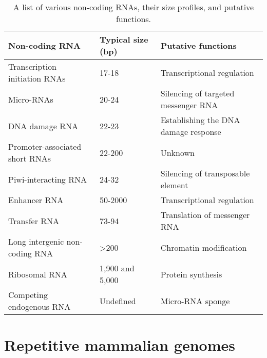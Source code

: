\begin{table}[h]
   \footnotesize
   \begin{tabular}{p{3cm} l p{5cm}}
\textbf{Non-coding RNA}                       & \textbf{Typical size (bp)} & \textbf{Putative functions}              \\ \hline
Transcription initiation RNAs                 & 17-18                      & Transcriptional regulation               \\ \hline
Micro-RNAs                                    & 20-24                      & Silencing of targeted messenger RNA      \\ \hline
DNA damage RNA                                & 22-23                      & Establishing the DNA damage response     \\ \hline
Promoter-associated short RNAs                & 22-200                     & Unknown                                  \\ \hline
Piwi-interacting RNA                          & 24-32                      & Silencing of transposable element        \\ \hline
Enhancer RNA                                  & 50-2000                    & Transcriptional regulation               \\ \hline
Transfer RNA                                  & 73-94                      & Translation of messenger RNA             \\ \hline
Long intergenic non-coding RNA                & \textgreater200            & Chromatin modification                   \\ \hline
Ribosomal RNA                                 & 1,900 and 5,000            & Protein synthesis                        \\ \hline
Competing endogenous RNA                      & Undefined                  & Micro-RNA sponge                         \\ \hline
   \end{tabular}
   \caption[Table of non-coding RNAs]{A list of various non-coding RNAs, their size profiles, and putative functions.}
   \label{table:ncRNAs}
\end{table}

\section{Repetitive mammalian genomes}

